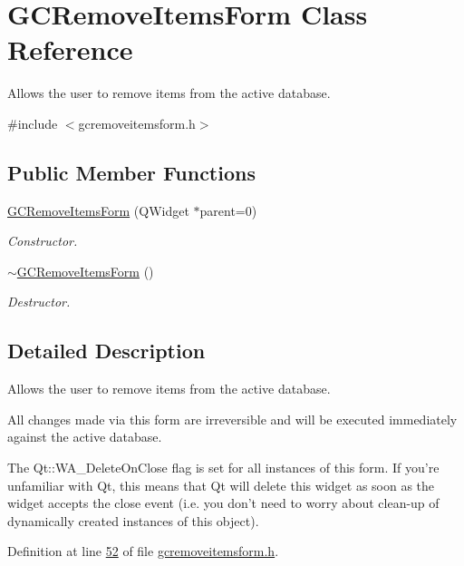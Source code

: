 \hypertarget{class_g_c_remove_items_form}{\section{\-G\-C\-Remove\-Items\-Form \-Class \-Reference}
\label{class_g_c_remove_items_form}
}


\-Allows the user to remove items from the active database.  




{\ttfamily \#include $<$gcremoveitemsform.\-h$>$}

\subsection*{\-Public \-Member \-Functions}
\begin{DoxyCompactItemize}
\item 
\hyperlink{class_g_c_remove_items_form_a8ef59eb50c10a50f70ef268110916d39}{\-G\-C\-Remove\-Items\-Form} (\-Q\-Widget $\ast$parent=0)
\begin{DoxyCompactList}\small\item\em \-Constructor. \end{DoxyCompactList}\item 
\hyperlink{class_g_c_remove_items_form_a9cf2b70d83b8f13e0283a76ef62b47d2}{$\sim$\-G\-C\-Remove\-Items\-Form} ()
\begin{DoxyCompactList}\small\item\em \-Destructor. \end{DoxyCompactList}\end{DoxyCompactItemize}


\subsection{\-Detailed \-Description}
\-Allows the user to remove items from the active database. 

\-All changes made via this form are irreversible and will be executed immediately against the active database.

\-The \-Qt\-::\-W\-A\-\_\-\-Delete\-On\-Close flag is set for all instances of this form. \-If you're unfamiliar with \-Qt, this means that \-Qt will delete this widget as soon as the widget accepts the close event (i.\-e. you don't need to worry about clean-\/up of dynamically created instances of this object). 

\-Definition at line \hyperlink{gcremoveitemsform_8h_source_l00052}{52} of file \hyperlink{gcremoveitemsform_8h_source}{gcremoveitemsform.\-h}.



